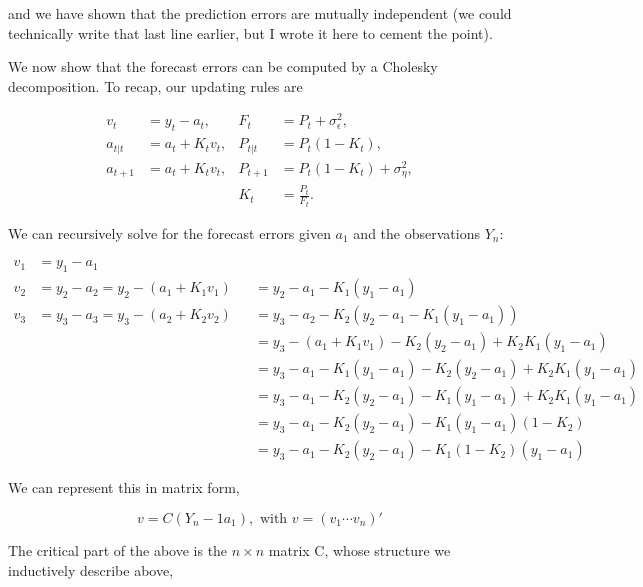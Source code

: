 \documentclass{tufte-book}
\begin{document}
\noindent and we have shown that the prediction errors are mutually independent (we could technically write that last line earlier, but I wrote it here to cement the point).

We now show that the forecast errors can be computed by a Cholesky decomposition. To recap, our  updating rules are 

\begin{align*}
v_t &= y_t - a_t, & F_t &= P_t + \sigma_\epsilon^2, \\
a_{t|t} &= a_t + K_t v_t, & P_{t|t} &= P_t(1-K_t), \\
a_{t+1} &= a_t + K_t v_t, & P_{t+1} &= P_t (1-K_t) + \sigma_\eta^2, \\
& & K_t &= \frac{P_t}{F_t}.
\end{align*}

\noindent We can recursively solve for the forecast errors given $a_1$ and the observations $Y_n$:

\begin{align*}
v_1 &= y_1 - a_1 \\
v_2 &= y_2 - a_2 = y_2 - (a_1 + K_1 v_1) &&= y_2 - a_1 - K_1 (y_1 - a_1) \\
v_3 &= y_3 - a_3 = y_3 - (a_2 + K_2 v_2) &&= y_3 - a_2 - K_2 (y_2 - a_1 - K_1 (y_1 - a_1)) \\
& &&= y_3 - (a_1 + K_1 v_1) - K_2 (y_2 - a_1) + K_2 K_1 (y_1 - a_1) \\
& &&= y_3 - a_1 - K_1 (y_1 - a_1) - K_2 (y_2 - a_1) + K_2 K_1 (y_1 - a_1) \\
& &&= y_3 - a_1 - K_2 (y_2 - a_1) - K_1 (y_1 - a_1) + K_2 K_1 (y_1 - a_1) \\
& &&= y_3 - a_1 - K_2 (y_2 - a_1) - K_1 (y_1 - a_1) (1 - K_2) \\
& &&= y_3 - a_1 - K_2 (y_2 - a_1) - K_1(1 - K_2)(y_1 - a_1)
\end{align*}

\noindent We can represent this in matrix form,

\[
v = C(Y_n - 1a_1), \text{ with } v = (v_1 \cdots v_n)'
\]

The critical part of the above is the $n \times n$ matrix C, whose structure we inductively describe above,
\end{document}
